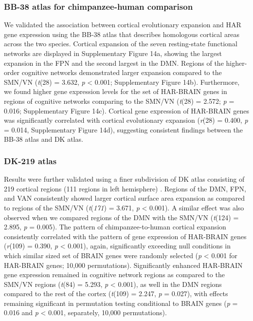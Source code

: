 \begin{refsection}
\subsubsection*{BB-38 atlas for chimpanzee-human comparison}
We validated the association between cortical evolutionary expansion and HAR gene expression using the BB-38 atlas that describes homologous cortical areas across the two species. Cortical expansion of the seven resting-state functional networks are displayed in Supplementary Figure 14a, showing the largest expansion in the FPN and the second largest in the DMN. Regions of the higher-order cognitive networks demonstrated larger expansion compared to the SMN/VN (\textit{t}(28) = 3.632, \textit{p} < 0.001; Supplementary Figure 14b). Furthermore, we found higher gene expression levels for the set of HAR-BRAIN genes in regions of cognitive networks comparing to the SMN/VN (\textit{t}(28) = 2.572; \textit{p} = 0.016; Supplementary Figure 14c). Cortical gene expression of HAR-BRAIN genes was significantly correlated with cortical evolutionary expansion (\textit{r}(28) = 0.400, \textit{p} = 0.014, Supplementary Figure 14d), suggesting consistent findings between the BB-38 atlas and DK atlas.

\subsubsection*{DK-219 atlas}
Results were further validated using a finer subdivision of DK atlas consisting of 219 cortical regions (111 regions in left hemisphere) \citep{DESIKAN2006968,CAMMOUN2012386}. Regions of the DMN, FPN, and VAN consistently showed larger cortical surface area expansion as compared to regions of the SMN/VN (\textit{t}(\textit{171}) = 3.671, \textit{p} < 0.001). A similar effect was also observed when we compared regions of the DMN with the SMN/VN (\textit{t}(124) = 2.895, \textit{p} = 0.005). The pattern of chimpanzee-to-human cortical expansion consistently correlated with the pattern of gene expression of HAR-BRAIN genes (\textit{r}(109) = 0.390, \textit{p} < 0.001), again, significantly exceeding null conditions in which similar sized set of BRAIN genes were randomly selected (\textit{p} < 0.001 for HAR-BRAIN genes; 10,000 permutations). Significantly enhanced HAR-BRAIN gene expression remained in cognitive network regions as compared to the SMN/VN regions (\textit{t}(84) = 5.293, \textit{p} < 0.001), as well in the DMN regions compared to the rest of the cortex (\textit{t}(109) = 2.247, \textit{p} = 0.027), with effects remaining significant in permutation testing conditional to BRAIN genes (\textit{p} = 0.016 and \textit{p} < 0.001, separately, 10,000 permutations).


\end{refsection}
